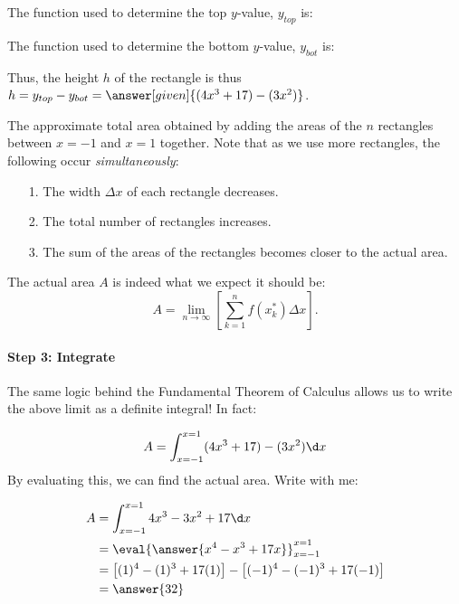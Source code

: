 \documentclass{ximera}
\begin{document}
\begin{question}
The function used to determine the top $y$-value, $y_{top}$ is:
\begin{multipleChoice}
\end{multipleChoice}
\end{question}

\begin{question}
The function used to determine the bottom $y$-value, $y_{bot}$ is:
\begin{multipleChoice}
\end{multipleChoice}
\end{question}

Thus, the height $h$ of the rectangle is thus $h=y_{top}-y_{bot} = \answer[given]{(4x^3+17)-(3x^2)}$.

The approximate total area obtained by adding the areas of the $n$ rectangles between $x=-1$ and $x=1$ together.  Note that as we use more rectangles, the following occur \emph{simultaneously}:

\begin{itemize}
\item[1.] The width $\Delta x$ of each rectangle decreases.
\item[2.] The total number of rectangles increases.
\item[3.] The sum of the areas of the rectangles becomes closer to the actual area.
\end{itemize}

The actual area $A$ is indeed what we expect it should be: $$A = \lim_{n \rightarrow \infty} \left[ \sum_{k=1}^n f(x_k^*) \Delta x \right].$$ 


\paragraph{Step 3: Integrate}

The same logic behind the Fundamental Theorem of Calculus allows us to write the above limit as a definite integral!  In fact:

\[
A = \int_{x=-1}^{x=1} (4x^3+17)-(3x^2) \d x
\]
By evaluating this, we can find the actual area.  Write with me:

\begin{align*}
A &= \int_{x=-1}^{x=1} 4x^3-3x^2+17 \d x \\
&= \eval{ \answer{x^4-x^3+17x}}_{x= -1}^{x=1} \\
&= \left[(1)^4-(1)^3+17(1)\right] -  \left[(-1)^4-(-1)^3+17(-1)\right] \\
&=\answer{32}
\end{align*}
\end{document}
